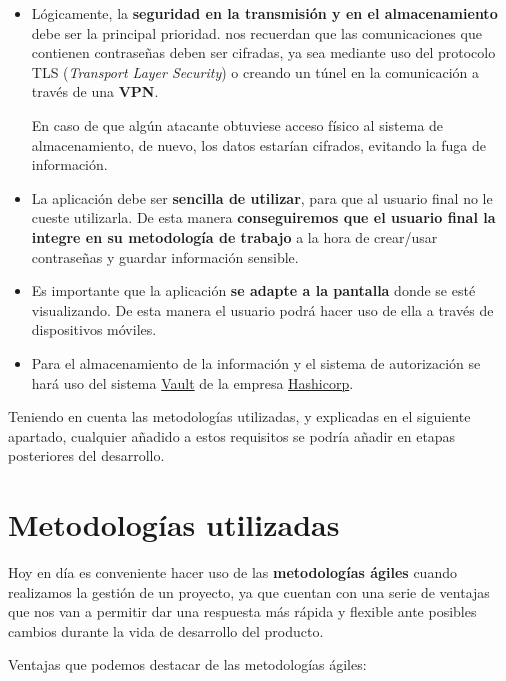 \documentclass{\ClassPath/viu-tfm-template}
\begin{document}
\begin{itemize}
    \item Lógicamente, la \textbf{seguridad en la transmisión y en el almacenamiento} debe ser la principal prioridad.  \textcite{scarfone2009guide} nos recuerdan que las comunicaciones que contienen contraseñas deben ser cifradas, ya sea mediante uso del protocolo TLS (\textit{Transport Layer Security}) o creando un túnel en la comunicación a través de una \textbf{VPN}.

    En caso de que algún atacante obtuviese acceso físico al sistema de almacenamiento, de nuevo, los datos estarían cifrados, evitando la fuga de información.

    \item La aplicación debe ser \textbf{sencilla de utilizar}, para que al usuario final no le cueste utilizarla. De esta manera \textbf{conseguiremos que el usuario final la integre en su metodología de trabajo} a la hora de crear/usar contraseñas y guardar información sensible.

    \item Es importante que la aplicación \textbf{se adapte a la pantalla} donde se esté visualizando. De esta manera el usuario podrá hacer uso de ella a través de dispositivos móviles.

    \item Para el almacenamiento de la información y el sistema de autorización se hará uso del sistema \href{https://www.vaultproject.io/}{Vault} de la empresa \href{https://www.hashicorp.com/}{Hashicorp}.
\end{itemize}

Teniendo en cuenta las metodologías utilizadas, y explicadas en el siguiente apartado, cualquier añadido a estos requisitos se podría añadir en etapas posteriores del desarrollo.




\chapter{Metodologías utilizadas}

Hoy en día es conveniente hacer uso de las \textbf{metodologías ágiles} cuando realizamos la gestión de un proyecto, ya que cuentan con una serie de ventajas que nos van a permitir dar una respuesta más rápida y flexible ante posibles cambios durante la vida de desarrollo del producto.

Ventajas que podemos destacar de las metodologías ágiles:
\end{document}
